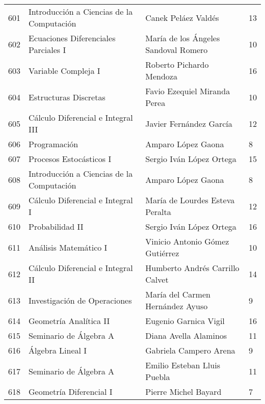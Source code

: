 \begin{table}[ht]
\begin{tabular}{rlll}
  601 & Introducción a Ciencias de la Computación & Canek Peláez Valdés & 13 \\ 
  602 & Ecuaciones Diferenciales Parciales I & María de los Ángeles Sandoval Romero & 10 \\ 
  603 & Variable Compleja I & Roberto Pichardo Mendoza & 16 \\ 
  604 & Estructuras Discretas & Favio Ezequiel Miranda Perea & 10 \\ 
  605 & Cálculo Diferencial e Integral III & Javier Fernández García & 12 \\ 
  606 & Programación & Amparo López Gaona & 8 \\ 
  607 & Procesos Estocásticos I & Sergio Iván López Ortega & 15 \\ 
  608 & Introducción a Ciencias de la Computación & Amparo López Gaona & 8 \\ 
  609 & Cálculo Diferencial e Integral I & María de Lourdes Esteva Peralta & 12 \\ 
  610 & Probabilidad II & Sergio Iván López Ortega & 16 \\ 
  611 & Análisis Matemático I & Vinicio Antonio Gómez Gutiérrez & 10 \\ 
  612 & Cálculo Diferencial e Integral II & Humberto Andrés Carrillo Calvet & 14 \\ 
  613 & Investigación de Operaciones & María del Carmen Hernández Ayuso & 9 \\ 
  614 & Geometría Analítica II & Eugenio Garnica Vigil & 16 \\ 
  615 & Seminario de Álgebra A & Diana Avella Alaminos & 11 \\ 
  616 & Álgebra Lineal I & Gabriela Campero Arena & 9 \\ 
  617 & Seminario de Álgebra A & Emilio Esteban Lluis Puebla & 11 \\ 
  618 & Geometría Diferencial I & Pierre Michel Bayard & 7 \\ 
   \hline
\end{tabular}
\end{table}




